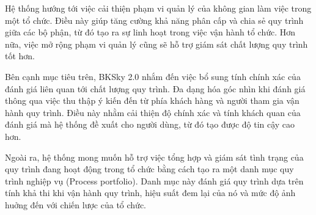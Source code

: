 
Hệ thống hướng tới việc cải thiện phạm vi quản lý của không gian làm việc trong một tổ chức. Điều này giúp tăng cường khả năng phân cấp và chia sẻ quy trình giữa các bộ phận, từ đó tạo ra sự linh hoạt trong việc vận hành tổ chức. Hơn nữa, việc mở rộng phạm vi quản lý cũng sẽ hỗ trợ giám sát chất lượng quy trình tốt hơn.

Bên cạnh mục tiêu trên, BKSky 2.0 nhắm đến việc bổ sung tính chính xác của đánh giá liên quan tới chất lượng quy trình. Đa dạng hóa góc nhìn khi đánh giá thông qua việc thu thập ý kiến đến từ phía khách hàng và người tham gia vận hành quy trình. Điều này nhằm cải thiện độ chính xác và tính khách quan của đánh giá mà hệ thống đề xuất cho người dùng, từ đó tạo được độ tin cậy cao hơn.

Ngoài ra, hệ thống mong muốn hỗ trợ việc tổng hợp và giám sát tình trạng của quy trình đang hoạt động trong tổ chức bằng cách tạo ra một danh mục quy trình nghiệp vụ (Process portfolio). Danh mục này đánh giá quy trình dựa trên tính khả thi khi vận hành quy trình, hiệu suất đem lại của nó và mức độ ảnh huởng đến với chiến lược của tổ chức.